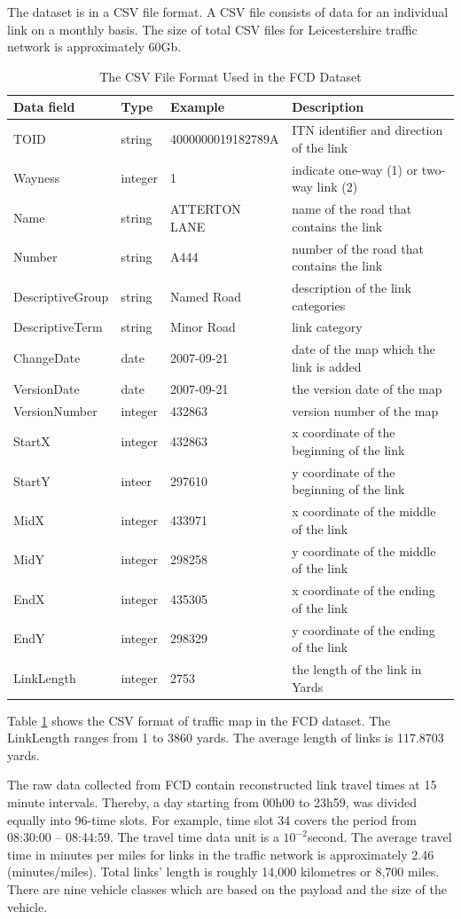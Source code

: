 \documentclass[journal]{IEEEtran}
\begin{document}
The dataset is in a CSV file format. A CSV file consists of data for an individual link on a monthly basis. The size of total CSV files for Leicestershire traffic network is approximately 60Gb.  
\begin{table}[!t]
	\caption{The CSV File Format Used in the FCD Dataset}
	\label{table:FCDmapformat}
	\begin{tabular}{llll}
		\hline
		Data field&	Type & Example & Description\\
		\hline
		TOID&	string& 4000000019182789A& ITN identifier and direction of the link\\
		Wayness& integer&	1& indicate one-way (1) or two-way link (2)\\	
		Name&	string&	ATTERTON LANE& name of the road that contains the link\\
		Number&	string&	A444& number of the road that contains the link\\
		DescriptiveGroup&	string&	Named Road& description of the link categories\\
		DescriptiveTerm&	string&	Minor Road& link category\\
		ChangeDate& date&	2007-09-21& date of the map which the link is added\\
		VersionDate&	date& 2007-09-21& the version date of the map\\
		VersionNumber&	integer& 432863& version number of the map\\
		StartX&	integer& 432863& x coordinate of the beginning of the link\\
		StartY&	inteer& 297610&	y coordinate of the beginning of the link\\
		MidX&	integer& 433971& x coordinate of the middle of the link\\
		MidY&	integer&	298258& y coordinate of the middle of the link\\
		EndX&	integer&	435305& x coordinate of the ending of the link\\
		EndY&	integer&	298329& y coordinate of the ending of the link\\
		LinkLength& integer& 2753& the length of the link in Yards\\
		\hline
	\end{tabular}
\end{table}
Table \ref{table:FCDmapformat} shows the CSV format of traffic map in the FCD dataset. The LinkLength ranges from 1 to 3860 yards. The average length of links is 117.8703 yards.


The raw data collected from FCD contain reconstructed link travel times at 15 minute intervals. Thereby, a day starting from 00h00 to 23h59, was divided equally into 96-time slots. For example, time slot 34 covers the period from 08:30:00 – 08:44:59. The travel time data unit is a $10^{-2}$second. The average travel time in minutes per miles for links in the traffic network is approximately 2.46 (minutes/miles). Total links' length is roughly 14,000 kilometres or 8,700 miles. There are nine vehicle classes which are based on the payload and the size of the vehicle.
\end{document}

